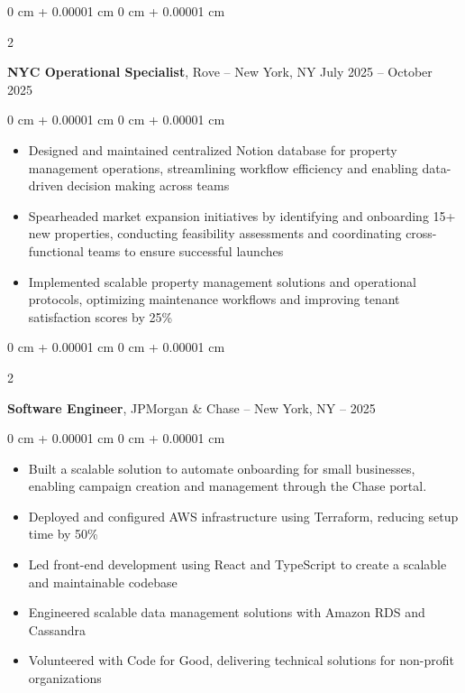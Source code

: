 \documentclass[10pt, letterpaper]{article}
\newenvironment{highlights}{
    \begin{itemize}[
        topsep=0.10 cm,
        parsep=0.10 cm,
        partopsep=0pt,
        itemsep=0pt,
        leftmargin=0 cm + 10pt
    ]
}{
    \end{itemize}
} %
\newenvironment{onecolentry}{
    \begin{adjustwidth}{
        0 cm + 0.00001 cm
    }{
        0 cm + 0.00001 cm
    }
}{
    \end{adjustwidth}
} %
\newenvironment{twocolentry}[2][]{
    \onecolentry
    \def\secondColumn{#2}
    \setcolumnwidth{\fill, 4.5 cm}
    \begin{paracol}{2}
}{
    \switchcolumn \raggedleft \secondColumn
    \end{paracol}
    \endonecolentry
} %
\begin{document}
    \vspace{0.4 cm}

        \begin{twocolentry}{
            July 2025 -- October 2025
        }
            \textbf{NYC Operational Specialist}, Rove -- New York, NY\end{twocolentry}

        \vspace{0.10 cm}
        \begin{onecolentry}
            \begin{highlights}
                \item Designed and maintained centralized Notion database for property management operations, streamlining workflow efficiency and enabling data-driven decision making across teams
                \item Spearheaded market expansion initiatives by identifying and onboarding 15+ new properties, conducting feasibility assessments and coordinating cross-functional teams to ensure successful launches
                \item Implemented scalable property management solutions and operational protocols, optimizing maintenance workflows and improving tenant satisfaction scores by 25\%
            \end{highlights}
        \end{onecolentry}

        \vspace{0.4 cm}

        \begin{twocolentry}{
            2022 -- 2025
        }
            \textbf{Software Engineer}, JPMorgan \& Chase -- New York, NY\end{twocolentry}

        \vspace{0.10 cm}
        \begin{onecolentry}
            \begin{highlights}
                \item Built a scalable solution to automate onboarding for small businesses, enabling campaign creation and management through the Chase portal.
                \item Deployed and configured AWS infrastructure using Terraform, reducing setup time by 50\%
                \item Led front-end development using React and TypeScript to create a scalable and maintainable codebase
                \item Engineered scalable data management solutions with Amazon RDS and Cassandra
                \item Volunteered with Code for Good, delivering technical solutions for non-profit organizations
            \end{highlights}
        \end{onecolentry}
\end{document}
